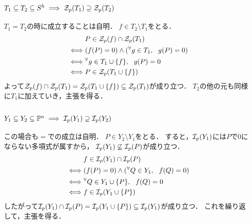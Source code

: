 \documentclass[a4paper]{jsarticle}
\begin{document}
    \subsection{$T_1 \subseteq T_2 \subseteq S^h \implies \mathcal{Z}_p(T_1) \supseteq \mathcal{Z}_p(T_2)$}
    $T_1=T_2$の時に成立することは自明．
    $f \in T_2 \setminus T_1$をとる．
    \begin{align*}
        {}&     P \in \mathcal{Z}_p(f) \cap \mathcal{Z}_p(T_1) \\
        \iff&   (f(P)=0) \land ({}^{\forall} g \in T_1,~~ g(P)=0) \\
        \iff&   {}^{\forall} g \in T_1 \cup \{f\},~~ g(P)=0 \\
        \iff&   P \in \mathcal{Z}_p(T_1 \cup \{f\})
    \end{align*}
    よって$\mathcal{Z}_p(f) \cap \mathcal{Z}_p(T_1)=\mathcal{Z}_p(T_1 \cup \{f\}) \subseteq \mathcal{Z}_p(T_1)$が成り立つ．
    $T_2$の他の元も同様に$T_1$に加えていき，主張を得る．

    \subsection{$Y_1 \subseteq Y_2 \subseteq \mathbb{P}^n \implies \mathcal{I}_p(Y_1) \supseteq \mathcal{I}_p(Y_2)$}
    この場合も$=$での成立は自明．
    $P \in Y_2 \setminus Y_1$をとる．
    すると，$\mathcal{I}_p(Y_1)$には$P$で0にならない多項式が属すから，
    $\mathcal{I}_p(Y_1) \not \subseteq \mathcal{I}_p(P)$が成り立つ．
    \begin{align*}
        {}&     f \in \mathcal{I}_p(Y_1) \cap \mathcal{I}_p(P) \\
        \iff&   (f(P)=0) \land ({}^{\forall} Q \in Y_1,~~ f(Q)=0) \\
        \iff&   {}^{\forall} Q \in Y_1 \cup \{P\},~~ f(Q)=0 \\
        \iff&   f \in \mathcal{I}_p(Y_1 \cup \{P\})
    \end{align*}
    したがって$\mathcal{I}_p(Y_1) \cap \mathcal{I}_p(P) = \mathcal{I}_p(Y_1 \cup \{P\}) \subseteq \mathcal{I}_p(Y_1)$が成り立つ．
    これを繰り返して，主張を得る．
\end{document}
